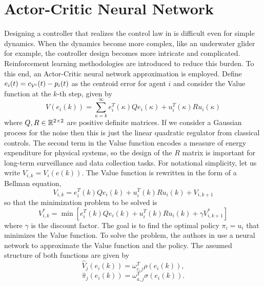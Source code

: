 \documentclass[10pt,conference]{IEEEtran}
\begin{document}
\section{Actor-Critic Neural Network}
	Designing a controller that realizes the control law in \cite{Cortes:2004} is difficult even for simple dynamics. When the dynamics become more complex, like an underwater glider for example, the controller design becomes more intricate and complicated. Reinforcement learning methodologies are introduced to reduce this burden. To this end, an Actor-Critic neural network approximation is employed. Define $e_i(t) = c_{\mathcal{V}^i}(t) - p_i(t)$ as the centroid error for agent $i$ and consider the Value function at the $k$-th step, given by 
	\begin{equation}
		\label{value function}
		\displaystyle V(e_i(k)) = \sum\limits_{\kappa = k}^{\infty}{e_i^T(\kappa)Qe_i(\kappa) + u_i^T(\kappa)Ru_i(\kappa)}
	\end{equation}
	where $Q, R \in \mathbb{R}^{2 \times 2}$ are positive definite matrices. If we consider a Gaussian process for the noise then this is just the linear quadratic regulator from classical controls. The second term in the Value function encodes a measure of energy expenditure for physical systems, so the design of the $R$ matrix is important for long-term surveillance and data collection tasks. For notational simplicity, let us write $V_{i,k} = V_i(e(k))$. The Value function is rewritten in the form of a Bellman equation, 
	\begin{equation}
		\displaystyle V_{i,k} = e_i^T(k)Qe_i(k) + u_i^T(k)Ru_i(k) + V_{i,k+1}
	\end{equation}
	so that the minimization problem to be solved is
	\begin{equation}
		\displaystyle V_{i,k}^* = \min\limits_{}{\left[ e_i^T(k)Qe_i(k) + u_i^T(k)Ru_i(k) + \gamma V_{i,k+1}^* \right]}
	\end{equation}
	where $\gamma$ is the discount factor. The goal is to find the optimal policy $\pi_i = u_i$ that minimizes the Value function. To solve the problem, the authors in \cite{FLAIRS1612802} use a neural network to approximate the Value function and the policy. The assumed structure of both functions are given by 
	\begin{equation}
		\displaystyle \widehat{V}_j(e_i(k)) = \omega_{c,j}^T\rho(e_i(k)),
	\end{equation}
	\begin{equation}
		\displaystyle \widehat{\pi}_{j}(e_i(k)) = \omega_{a,j}^T\sigma(e_i(k)).
	\end{equation}
\end{document}
